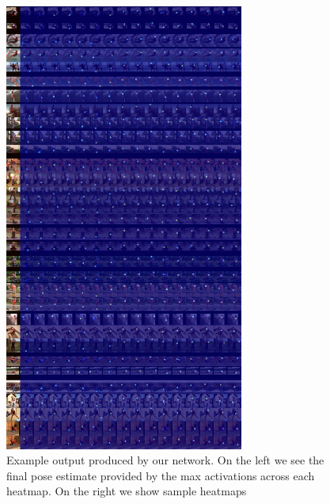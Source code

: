 \documentclass[final]{cvpr}
\begin{document}
\begin{figure}[h]
\centering
\includegraphics[width=0.7\textwidth]{val_20_hm_pred.jpg}
\caption{Example output produced by our network. On the left we see the final pose estimate provided by the max activations across each heatmap. On the right we show sample heatmaps}
\end{figure}



\end{document}
